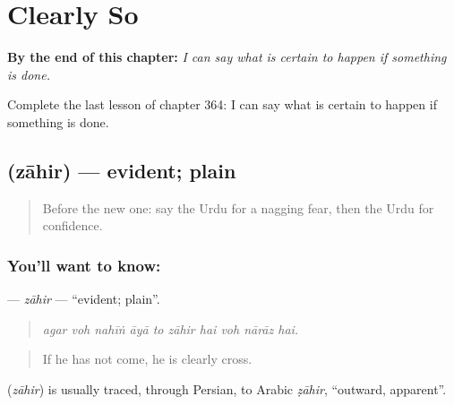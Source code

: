 
\chapter{Clearly So}
\label{ch:ur-clearly-so}

\begin{chapteropening}
\textbf{By the end of this chapter:} \emph{I can say what is certain to happen if something is done.}

Complete the last lesson of chapter 364: I can say what is certain to happen if something is done.
\end{chapteropening}

\section[\texorpdfstring{\ur{ظاہر} (zāhir)}{ظاہر (zāhir)}]{ (zāhir) — evident; plain}

\label{lesson:UR-C364-zahir}



\begin{quote}
Before the new one: say the Urdu for a nagging fear, then the Urdu for confidence.
\end{quote}

\subsection*{You'll want to know: }
\textbf{} — \emph{zāhir} — \textquotedblleft{}evident; plain\textquotedblright{}.

\begin{quote}
         
\end{quote}

\begin{quote}
\emph{agar voh nahīṅ āyā to zāhir hai voh nārāz hai.}
\end{quote}

\begin{quote}
If he has not come, he is clearly cross.
\end{quote}

\begin{cousinweb}
\textbf{} (\emph{zāhir}) is usually traced, through Persian, to Arabic \emph{ẓāhir}, \textquotedblleft{}outward, apparent\textquotedblright{}.
\end{cousinweb}

